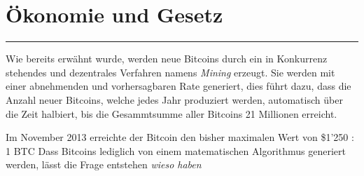 \section*{Ökonomie und Gesetz}
\vspace{-10mm}
\noindent\rule{0.8\textwidth}{0.4pt}

\vspace{5mm}

\noindent
Wie bereits erwähnt wurde, werden neue Bitcoins durch ein in Konkurrenz stehendes und
dezentrales Verfahren namens \emph{Mining} erzeugt. Sie werden mit einer abnehmenden
und vorhersagbaren Rate generiert, dies führt dazu, dass die Anzahl neuer Bitcoins,
welche jedes Jahr produziert werden, automatisch über die Zeit halbiert, bis die Gesammtsumme
aller Bitcoins 21 Millionen erreicht.

Im November 2013 erreichte der Bitcoin den bisher maximalen Wert von \$1'250 : 1 BTC
Dass Bitcoins lediglich von einem matematischen Algorithmus generiert werden, lässt
die Frage entstehen \emph{\dq wieso haben }

\newpage
